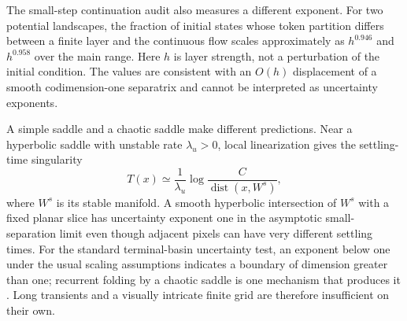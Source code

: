 \documentclass[11pt,a4paper]{article}
\theoremstyle{definition}
\begin{document}
The small-step continuation audit also measures a different exponent.  For two
potential landscapes, the fraction of initial states whose token partition differs
between a finite layer and the continuous flow scales approximately as $h^{0.946}$
and $h^{0.958}$ over the main range.  Here $h$ is layer strength, not a perturbation
of the initial condition.  The values are consistent with an $O(h)$ displacement of
a smooth codimension-one separatrix and cannot be interpreted as uncertainty
exponents.

A simple saddle and a chaotic saddle make different predictions.  Near a hyperbolic
saddle with unstable rate $\lambda_u>0$, local linearization gives the settling-time
singularity
\begin{equation}
 T(x)\simeq \frac{1}{\lambda_u}
 \log\frac{C}{\operatorname{dist}(x,W^s)},
 \label{eq:saddle-settling}
\end{equation}
where $W^s$ is its stable manifold.  A smooth hyperbolic intersection of $W^s$ with
a fixed planar slice has uncertainty exponent one in the asymptotic small-separation
limit even though adjacent pixels can have very different settling times.  For the
standard terminal-basin uncertainty test, an exponent below one under the usual
scaling assumptions indicates a boundary of dimension greater than one; recurrent
folding by a chaotic saddle is one mechanism that produces it
\cite{grebogi1983fractal}.  Long transients and
a visually intricate finite grid are therefore insufficient on their own.
\end{document}
